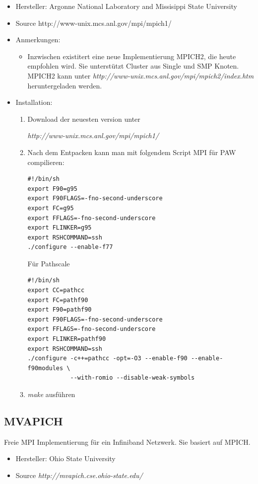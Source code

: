 \documentclass[a4paper,10pt]{report}
\begin{document}
\begin{itemize}
\item Hersteller: Argonne National Laboratory and Missisippi State University
\item Source http://www-unix.mcs.anl.gov/mpi/mpich1/
\item Anmerkungen:
\begin{itemize}
\item Inzwischen existitert eine neue Implementierung MPICH2, die
heute empfohlen wird. Sie unterst\"utzt Cluster aus Single und SMP Knoten.
MPICH2 kann unter
\textit{http://www-unix.mcs.anl.gov/mpi/mpich2/index.htm}
heruntergeladen werden.
\end{itemize}
\item Installation:
\begin{enumerate}
\item Download der neuesten version unter
\begin{center}
\textit{http://www-unix.mcs.anl.gov/mpi/mpich1/}
\end{center}
\item Nach dem Entpacken kann man mit folgendem Script MPI für PAW compilieren:
\begin{verbatim}
#!/bin/sh
export F90=g95
export F90FLAGS=-fno-second-underscore
export FC=g95
export FFLAGS=-fno-second-underscore
export FLINKER=g95
export RSHCOMMAND=ssh
./configure --enable-f77
\end{verbatim}
F\"ur Pathscale
\begin{verbatim}
#!/bin/sh
export CC=pathcc
export FC=pathf90 
export F90=pathf90 
export F90FLAGS=-fno-second-underscore 
export FFLAGS=-fno-second-underscore
export FLINKER=pathf90
export RSHCOMMAND=ssh
./configure -c++=pathcc -opt=-O3 --enable-f90 --enable-f90modules \
            --with-romio --disable-weak-symbols 
\end{verbatim}



\item \textit{make} ausf\"uhren
\end{enumerate}
\end{itemize}

\subsection{MVAPICH}
\label{sec:mvapich}
Freie MPI Implementierung für ein Infiniband Netzwerk. Sie basiert auf MPICH.
\begin{itemize}
\item Hersteller: Ohio State University
\item Source \textit{http://mvapich.cse.ohio-state.edu/}
\end{itemize}
\end{document}
